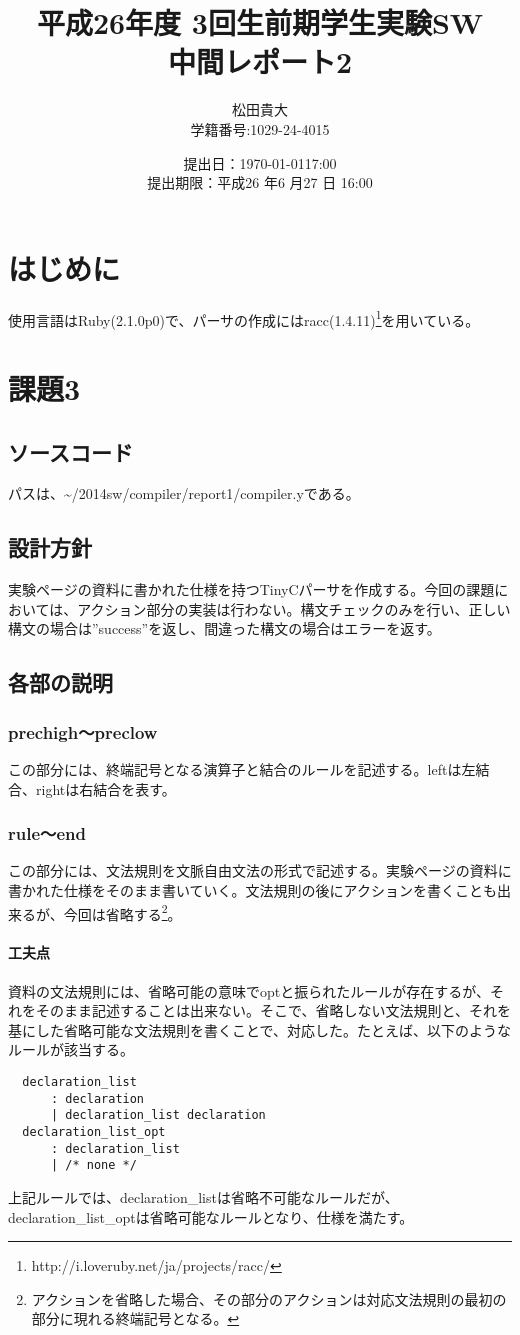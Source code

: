 \documentclass[titlepage, a4paper,12pt]{jarticle}
\title{平成26年度 3回生前期学生実験SW \\ 中間レポート2}
\author{松田貴大 \\ \small{学籍番号:1029-24-4015}}
\date{提出日：\today 17:00 \\ 提出期限：平成26 年6 月27 日 16:00}
\begin{document}
\maketitle
\lstset{numbers=left,basicstyle=\small}
\section{はじめに}
使用言語はRuby(2.1.0p0)で、パーサの作成にはracc(1.4.11)\footnote{http://i.loveruby.net/ja/projects/racc/}を用いている。
\section{課題3}
\subsection{ソースコード}
\label{sec:source}
パスは、\~{}/2014sw/compiler/report1/compiler.yである。

\subsection{設計方針}
実験ページの資料に書かれた仕様を持つTinyCパーサを作成する。今回の課題においては、アクション部分の実装は行わない。構文チェックのみを行い、正しい構文の場合は''success''を返し、間違った構文の場合はエラーを返す。
\subsection{各部の説明}
\subsubsection{prechigh～preclow}
この部分には、終端記号となる演算子と結合のルールを記述する。leftは左結合、rightは右結合を表す。
\subsubsection{rule～end}
この部分には、文法規則を文脈自由文法の形式で記述する。実験ページの資料に書かれた仕様をそのまま書いていく。文法規則の後にアクションを書くことも出来るが、今回は省略する\footnote{アクションを省略した場合、その部分のアクションは対応文法規則の最初の部分に現れる終端記号となる。}。
\paragraph{工夫点}
資料の文法規則には、省略可能の意味でoptと振られたルールが存在するが、それをそのまま記述することは出来ない。そこで、省略しない文法規則と、それを基にした省略可能な文法規則を書くことで、対応した。たとえば、以下のようなルールが該当する。
\begin{verbatim}
  declaration_list
      : declaration
      | declaration_list declaration
  declaration_list_opt
      : declaration_list
      | /* none */
\end{verbatim}
上記ルールでは、declaration\_listは省略不可能なルールだが、declaration\_list\_optは省略可能なルールとなり、仕様を満たす。
\end{document}
